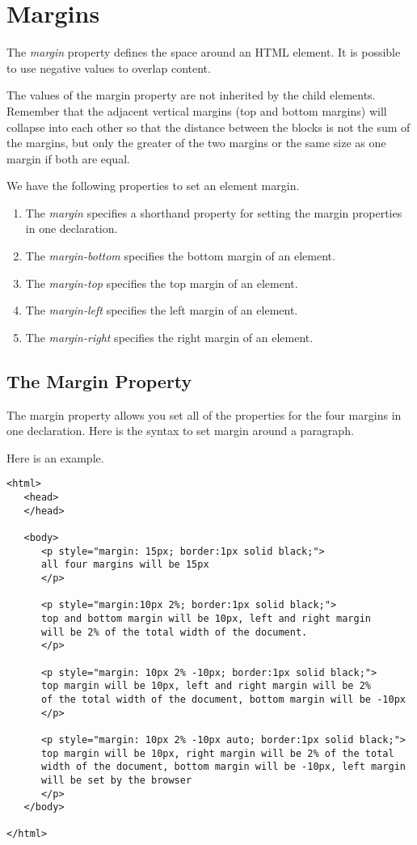 \documentclass[a4paper,oneside]{book}
\numberwithin{equation}{chapter}
\begin{document}
\section{Margins}
The \textit{margin} property defines the space around an HTML element. It is possible to use negative values to overlap content.

The values of the margin property are not inherited by the child elements. Remember that the adjacent vertical margins (top and bottom margins) will collapse into each other so that the distance between the blocks is not the sum of the margins, but only the greater of the two margins or the same size as one margin if both are equal.

We have the following properties to set an element margin.
\begin{enumerate}
\item The \textit{margin} specifies a shorthand property for setting the margin properties in one declaration.
\item The \textit{margin-bottom} specifies the bottom margin of an element.
\item The \textit{margin-top} specifies the top margin of an element.
\item The \textit{margin-left} specifies the left margin of an element.
\item The \textit{margin-right} specifies the right margin of an element.
\end{enumerate}
\subsection{The Margin Property}
The margin property allows you set all of the properties for the four margins in one declaration. Here is the syntax to set margin around a paragraph.

Here is an example.
\begin{verbatim}
<html>
   <head>
   </head>
   
   <body>
      <p style="margin: 15px; border:1px solid black;"> 
      all four margins will be 15px 
      </p>
      
      <p style="margin:10px 2%; border:1px solid black;">
      top and bottom margin will be 10px, left and right margin 
      will be 2% of the total width of the document. 
      </p>
      
      <p style="margin: 10px 2% -10px; border:1px solid black;">
      top margin will be 10px, left and right margin will be 2%
      of the total width of the document, bottom margin will be -10px
      </p> 
      
      <p style="margin: 10px 2% -10px auto; border:1px solid black;">
      top margin will be 10px, right margin will be 2% of the total 
      width of the document, bottom margin will be -10px, left margin
      will be set by the browser 
      </p>
   </body>
   
</html>
\end{verbatim}
\end{document}
